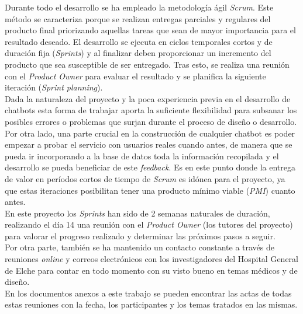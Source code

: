 Durante todo el desarrollo se ha empleado la metodología ágil \textit{Scrum}. Este método se caracteriza porque se realizan entregas parciales y regulares del producto final priorizando aquellas tareas que sean de mayor importancia para el resultado deseado. El desarrollo se ejecuta en ciclos temporales cortos y de duración fija (\textit{Sprints}) y al finalizar deben proporcionar un incremento del producto que sea susceptible de ser entregado. Tras esto, se realiza una reunión con el \textit{Product Owner} para evaluar el resultado y se planifica la siguiente iteración (\textit{Sprint planning}).\\

Dada la naturaleza del proyecto y la poca experiencia previa en el desarrollo de chatbots esta forma de trabajar aporta la suficiente flexibilidad para subsanar los posibles errores o problemas que surjan durante el proceso de diseño o desarrollo. Por otra lado, una parte crucial en la construcción de cualquier chatbot es poder empezar a probar el servicio con usuarios reales cuando antes, de manera que se pueda ir incorporando a la base de datos toda la información recopilada y el desarrollo se pueda beneficiar de este \textit{feedback}. Es en este punto donde la entrega de valor en períodos cortos de tiempo de \textit{Scrum} es idónea para el proyecto, ya que estas iteraciones posibilitan tener una producto mínimo viable (\textit{PMI}) cuanto antes.\\

En este proyecto los \textit{Sprints} han sido de 2 semanas naturales de duración, realizando el día 14 una reunión con el \textit{Product Owner} (los tutores del proyecto) para valorar el progreso realizado y determinar las próximos pasos a seguir. \\

Por otra parte, también se ha mantenido un contacto constante a través de reuniones \textit{online} y correos electrónicos con los investigadores del Hospital General de Elche para contar en todo momento con su visto bueno en temas médicos y de diseño.\\

En los documentos anexos a este trabajo se pueden encontrar las actas de todas estas reuniones con la fecha, los participantes y los temas tratados en las mismas.\\



